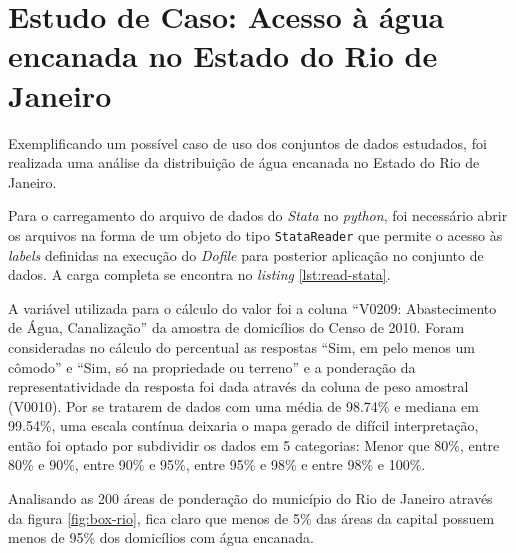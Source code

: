 

\chapter{Estudo de Caso: Acesso à água encanada no Estado do Rio de Janeiro}

    Exemplificando um possível caso de uso dos conjuntos de dados estudados, foi realizada uma análise da distribuição de água encanada no Estado do Rio de Janeiro.

    Para o carregamento do arquivo de dados do \textit{Stata} no \textit{python}, foi necessário abrir os arquivos na forma de um objeto do tipo \verb|StataReader| que permite o acesso às \textit{labels} definidas na execução do \textit{Dofile} para posterior aplicação no conjunto de dados. A carga completa se encontra no \textit{listing} \ref{lst:read-stata}. 
    
    A variável utilizada para o cálculo do valor foi a coluna ``V0209: Abastecimento de Água, Canalização'' da amostra de domicílios do Censo de 2010. Foram consideradas no cálculo do percentual as respostas ``Sim, em pelo menos um cômodo'' e ``Sim, só na propriedade ou terreno'' e a ponderação da representatividade da resposta foi dada através da coluna de peso amostral (V0010). Por se tratarem de dados com uma média de 98.74\% e mediana em 99.54\%, uma escala contínua deixaria o mapa gerado de difícil interpretação, então foi optado por subdividir os dados em 5 categorias: Menor que 80\%, entre 80\% e 90\%, entre 90\% e 95\%, entre 95\% e 98\% e entre 98\% e 100\%.

    Analisando as 200 áreas de ponderação do município do Rio de Janeiro através da figura \ref{fig:box-rio}, fica claro que menos de 5\% das áreas da capital possuem menos de 95\% dos domicílios com água encanada.

